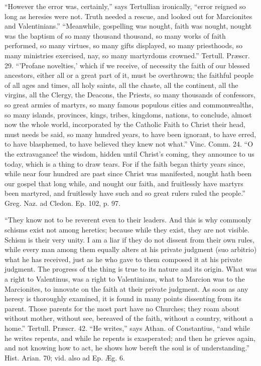 ``However the error was, certainly,'' says
Tertullian ironically, ``error reigned so long as heresies were not.
Truth needed a rescue, and looked out for Marcionites and Valentinians.''
``Meanwhile, gospelling was nought, faith was nought, nought was the
baptism of so many thousand thousand, so many works of faith
performed, so many virtues, so many gifts displayed, so many
priesthoods, so many ministries exercised, nay, so many martyrdoms
crowned.'' Tertull. Præscr. 29. ``'Profane novelties,' which if we
receive, of necessity the faith of our blessed ancestors, either all
or a great part of it, must be overthrown; the faithful people of all
ages and times, all holy saints, all the chaste, all the continent,
all the virgins, all the Clergy, the Deacons, the Priests, so many
thousands of confessors, so great armies of martyrs, so many famous
populous cities and commonwealths, so many islands, provinces, kings,
tribes, kingdoms, nations, to conclude, almost now the whole world,
incorporated by the Catholic Faith to Christ their head, must needs be
said, so many hundred years, to have been ignorant, to have erred, to
have blasphemed, to have believed they knew not what.'' Vinc. Comm.
24. ``O the extravagance! the wisdom, hidden until Christ's coming,
they announce to us today, which is a thing to draw tears. For if the
faith began thirty years since, while near four hundred are past since
Christ was manifested, nought hath been our gospel that long while,
and nought our faith, and fruitlessly have martyrs been martyred, and
fruitlessly have such and so great rulers ruled the people.'' Greg.
Naz. ad Cledon. Ep. 102, p. 97.

``They know not to be reverent even to their
leaders. And this is why commonly schisms exist not among heretics;
because while they exist, they are not visible. Schism is their very
unity. I am a liar if they do not dissent from their own rules, while
every man among them equally alters at his private judgment (suo
arbitrio) what he has received, just as he who gave to them composed
it at his private judgment. The progress of the thing is true to its
nature and its origin. What was a right to Valentinus, was a right to
Valentinians, what to Marcion was to the Marcionites, to innovate on
the faith at their private judgment. As soon as any heresy is
thoroughly examined, it is found in many points dissenting from its
parent. Those parents for the most part have no Churches; they roam
about without mother, without see, bereaved of the faith, without a
country, without a home.'' Tertull. Præscr. 42. ``He writes,''
says Athan. of Constantius, ``and while he writes repents, and while
he repents is exasperated; and then he grieves again, and not knowing
how to act, he shows how bereft the soul is of understanding.'' Hist.
Arian. 70; vid. also ad Ep. Æg. 6.

